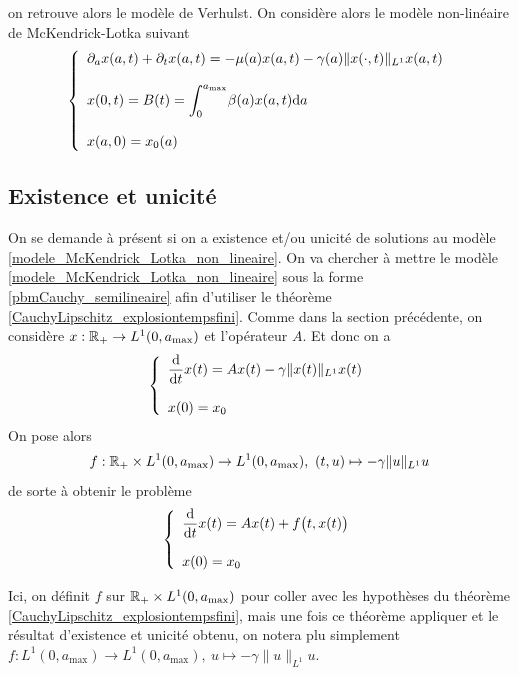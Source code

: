on retrouve alors le modèle de Verhulst. On considère alors le modèle non-linéaire de McKendrick-Lotka suivant
\begin{equation}\label{modele_McKendrick_Lotka_non_lineaire}
    \left\{\begin{array}{l}
        \partial_a x(a,t) + \partial_t x(a,t) = -\mu(a)x(a,t)-\gamma(a)\|x(\cdot,t)\|_{L^1}x(a,t) \\
        \\
        x(0,t) = B(t) = \displaystyle{\int_0^{a_{\max}}} \beta (a)x(a,t)\mathrm{d} a \\
        \\
        x(a,0) = x_0(a)
    \end{array}\right.
\end{equation}

\subsection{Existence et unicité}
On se demande à présent si on a existence et/ou unicité de solutions au modèle \eqref{modele_McKendrick_Lotka_non_lineaire}. On va chercher à mettre le modèle \eqref{modele_McKendrick_Lotka_non_lineaire} sous la forme \eqref{pbmCauchy_semilineaire} afin d'utiliser le théorème \ref{CauchyLipschitz_explosiontempsfini}. Comme dans la section précédente, on considère $x: \mathbb{R}_+ \rightarrow L^1(0,a_{\max})$ et l'opérateur $A$. Et donc on a 
\begin{equation*}
    \left\{\begin{array}{l}
        \dfrac{\mathrm{d}}{\mathrm{d} t}x(t) = Ax(t) -\gamma\|x(t)\|_{L^1}x(t) \\
        \\
        x(0) = x_0
    \end{array}\right.
\end{equation*}
On pose alors 
\begin{eqnarray*}
    f : \bbR_+ \times L^1(0,a_{\max}) \rightarrow L^1(0,a_{\max}), \ (t,u) \mapsto - \gamma \|u\|_{L^1}u
\end{eqnarray*}
de sorte à obtenir le problème 
\begin{equation}\label{pbmCauchy_McKendrick_Lotka_non_lineaire}
    \left\{\begin{array}{l}
        \dfrac{\mathrm{d}}{\mathrm{d} t}x(t) = Ax(t) + f\big(t,x(t)\big) \\
        \\
        x(0) = x_0
    \end{array}\right.
\end{equation}
\begin{remark}
    Ici, on définit $f$ sur $\mathbb{R}_+ \times L^1(0,a_{\max})$ pour coller avec les hypothèses du théorème \ref{CauchyLipschitz_explosiontempsfini}, mais une fois ce théorème appliquer et le résultat d'existence et unicité obtenu, on notera plu simplement $f : L^1(0,a_{\max}) \rightarrow L^1(0,a_{\max}), \ u \mapsto -\gamma \|u\|_{L^1}u$.
\end{remark}

